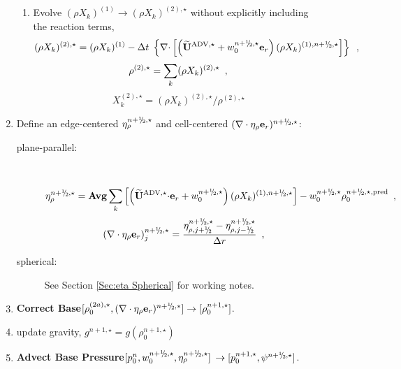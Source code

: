 \begin{description}
\begin{enumerate}
\begin{enumerate}
  \item Evolve $(\rho X_k)^{(1)} \rightarrow (\rho X_k)^{(2),\star}$
  without explicitly including the reaction terms,
\begin{equation}
(\rho X_k)^{(2),\star} = (\rho X_k)^{(1)} 
 - \dt \; \left\{ \nablab \cdotb \left[ \left(\uadvone+w_0^{\nph,\star} \er\right)  
  (\rho X_k)^{(1),\nph,\star} \right] \right\} \enskip ,
\end{equation}
\begin{equation}
\rho^{(2),\star} = \sum_k (\rho X_k)^{(2),\star} \enskip ,
\end{equation}
\begin{equation}
X_k^{(2),\star} = (\rho X_k)^{(2),\star} / \rho^{(2),\star}
\end{equation}

\end{enumerate}

\item Define an edge-centered $\etarho^{\nph,\star}$ and  cell-centered 
$(\nabla\cdot\etarho\er)^{\nph,\star}$:

\begin{description}
\item[plane-parallel:]~

\begin{equation}
 \etarho^{\nph,\star} =  {\rm {\bf Avg}} \sum_k \left[ \left(\uadvone \cdotb \er + w_0^{\nph,\star}\right) (\rho X_k)^{(1),\nph,\star} \right] - w_0^{\nph,\star} \rho_0^{\nph,\star,{\rm pred}} \enskip ,
\end{equation}
\begin{equation}
(\nabla\cdot\etarho\er)_j^{\nph,\star} = 
\frac{\eta_{\rho,j+\myhalf}^{\nph,\star}-\eta_{\rho,j-\myhalf}^{\nph,\star}}{\Delta r} \enskip ,
\end{equation}

\item[spherical:] See Section \ref{Sec:eta Spherical} for working notes.

\end{description}

\item {\bf Correct Base}$[\rho_0^{(2a),\star}, (\nabla\cdot\etarho\er)^{\nph,*}] \rightarrow [\rho_0^{n+1,\star}]$.

\item update gravity, $g^{n+1,\star} = g(\rho_0^{n+1,\star})$

\item {\bf Advect Base Pressure}$[p_0^{n}, w_0^{\nph,\star}, \etarho^{n+\myhalf,\star}]$ 
$\rightarrow [p_0^{n+1,\star}, \psi^{\nph,\star}]$.


\end{enumerate}
\end{description}
